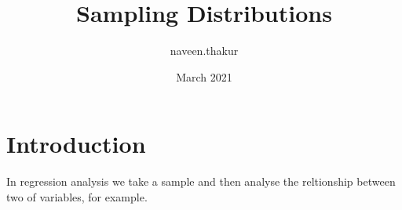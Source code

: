 \documentclass{article}
\title{Sampling Distributions}
\author{naveen.thakur }
\date{March 2021}
\begin{document}
\maketitle

\section{Introduction}
In regression analysis we take a sample and then analyse the reltionship between two of variables, for example. 
\end{document}
